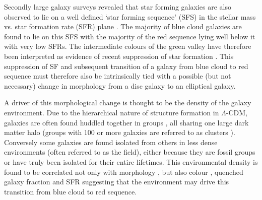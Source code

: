 Secondly large galaxy surveys revealed that star forming galaxies are also observed to lie on a well defined `star forming sequence' (SFS) in the stellar mass vs. star formation rate (SFR) plane \citep{brinchmann04, Salim07, daddi07}. The majority of blue cloud galaxies are found to lie on this SFS with the majority of the red sequence lying well below it with very low SFRs. The intermediate colours of the green valley have therefore been interpreted as evidence of recent suppression of star formation \citep[SF;][]{Salim07}. This suppression of SF and subsequent transition of a galaxy from blue cloud to red sequence must therefore also be intrinsically tied with a possible (but not necessary) change in morphology from a disc galaxy to an elliptical galaxy.

A driver of this morphological change is thought to be the density of the galaxy environment. Due to the hierarchical nature of structure formation in $\Lambda$-CDM, galaxies are often found huddled together in groups \citep{zwicky38, zwicky52, abell58}, all sharing one large dark matter halo (groups with 100 or more galaxies are referred to as clusters \citealt{bower04}). Conversely some galaxies are found isolated from others in less dense environments (often referred to as the field), either because they are fossil groups \citep[where all members have eventually merged][]{ponman94, jones00, jones03} or have truly been isolated for their entire lifetimes. This environmental density is found to be correlated not only with morphology \citep[][and see Figure~\ref{fig:dressler}]{dressler80, smail97, poggianti99, postman05, Bamford09}, but also colour \citep{butcher78, pimbblet02}, quenched galaxy fraction \citep{kauffmann03, Baldry06, peng12, darvish16} and SFR \citep{gomez03} suggesting that the environment may drive this transition from blue cloud to red sequence. 

